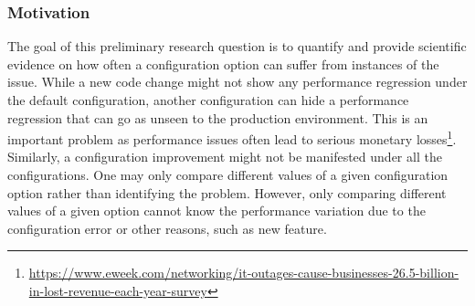 \subsubsection*{Motivation}
The goal of this preliminary research question is to quantify and provide scientific evidence on how often a configuration option can suffer from instances of the \inconsistent issue. %
While a new code change might not show any performance regression under the default configuration, another configuration can hide a performance regression that can go as unseen to the production environment. This is an important problem as performance issues often lead to serious monetary losses\footnote{\url{https://www.eweek.com/networking/it-outages-cause-businesses-26.5-billion-in-lost-revenue-each-year-survey}}. Similarly, a configuration improvement might not be manifested under all the configurations. 
One may only compare different values of a given configuration option rather than identifying the \inconsistent problem. However, only comparing different values of a given option cannot know the performance variation due to the configuration error or other reasons, such as new feature. %

 
